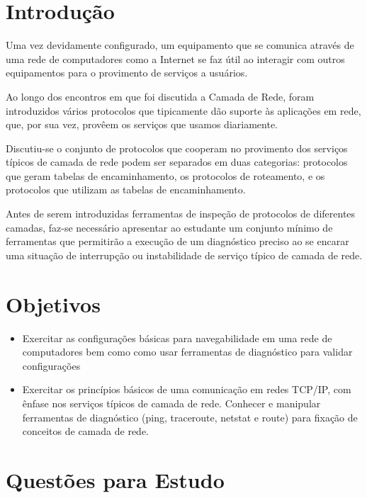 \section{Introdução}

Uma vez devidamente configurado, um equipamento que se comunica através de uma rede de
computadores como a Internet se faz útil ao interagir com outros equipamentos para o provimento
de serviços a usuários.

Ao longo dos encontros em que foi discutida a Camada de Rede, foram introduzidos vários
protocolos que tipicamente dão suporte às aplicações em rede, que, por sua vez, provêem os
serviços que usamos diariamente.

Discutiu-se o conjunto de protocolos que cooperam no provimento dos serviços típicos de camada
de rede podem ser separados em duas categorias: protocolos que geram tabelas de encaminhamento,
os protocolos de roteamento, e os protocolos que utilizam as tabelas de encaminhamento.

Antes de serem introduzidas ferramentas de inspeção de protocolos de diferentes camadas, faz-se
necessário apresentar ao estudante um conjunto mínimo de ferramentas que permitirão a execução
de um diagnóstico preciso ao se encarar uma situação de interrupção ou instabilidade de serviço
típico de camada de rede.

\section{Objetivos}

\begin{itemize}
  \item  Exercitar as configurações básicas para navegabilidade em uma rede de computadores bem como
    como usar ferramentas de diagnóstico para validar configurações
  \item Exercitar os princípios básicos de uma comunicação em redes TCP/IP, com ênfase nos serviços
    típicos de camada de rede. Conhecer e manipular ferramentas de diagnóstico (ping,
    traceroute, netstat e route) para fixação de conceitos de camada de rede.
\end{itemize}

\section{Questões para Estudo}


